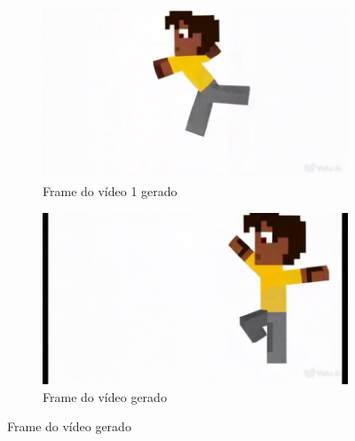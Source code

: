 \begin{figure}[htbp]
\begin{subfigure}{0.45\linewidth}
        \includegraphics[width=1\linewidth]{figs/vidu/framePulo1.jpg}
        \caption{\small Frame do vídeo 1 gerado}
        \label{fig:viduPulo1b}
    \end{subfigure}
    \begin{subfigure}{0.45\linewidth}
        \includegraphics[width=1\linewidth]{figs/vidu/framePulo1_2.jpg}
        \caption{\small Frame do vídeo gerado}
        \label{fig:viduPulo1c}
    \end{subfigure}
\end{figure}

